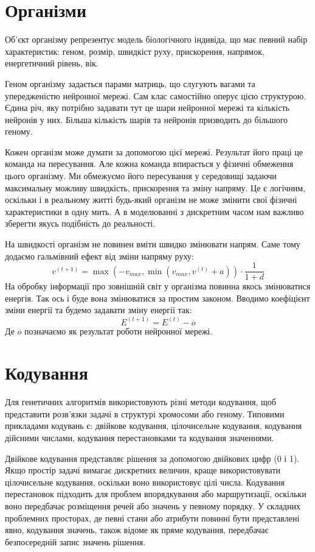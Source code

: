\section{Організми}

Об’єкт організму репрезентує модель біологічного індивіда, що має певний набір характеристик: геном, розмір, швидкіст руху, прискорення, напрямок, енергетичний рівень, вік.

Геном організму задається парами матриць, що слугують вагами та упередженістю нейронної мережі. Сам клас самостійно оперує цією структурою. Єдина річ, яку потрібно задавати тут це шари нейронної мережі та кількість нейронів у них. Більша кількість шарів та нейронів призводить до більшого геному.

Кожен організм може думати за допомогою цієї мережі. Результат його праці це команда на пересування. Але кожна команда впирається у фізичні обмеження цього організму. Ми обмежуємо його пересування у середовищі задаючи максимальну можливу швидкість, прискорення та зміну напряму. Це є логічним, оскільки і в реальному житті будь-який організм не може змінити свої фізичні характеристики в одну мить. А в моделюванні з дискретним часом нам важливо зберегти якусь подібність до реальності.

На швидкості організм не повинен вміти швидко змінювати напрям. Саме тому додаємо гальмівний ефект від зміни напряму руху:
\[
  v^{(t+1)} = \max(-v_{max}, \min(v_{max}, v^{(t)} + a)) \cdot \frac{1}{1 + d}
\]
На обробку інформації про зовнішній світ у організма повинна якось змінюватися енергія. Так ось і буде вона змінюватися за простим законом. Вводимо коефіцієнт зміни енергії  та будемо задавати зміну енергії так:
\[ E^{(t+1)} = E^{(t)} - \overline{o} \]
Де $\overline{o}$ позначаємо як результат роботи нейронної мережі.

\section{Кодування}

Для генетичних алгоритмів використовують різні методи кодування, щоб представити розв'язки задачі в структурі хромосоми або геному. Типовими прикладами кодувань є: двійкове кодування, цілочисельне кодування, кодування дійсними числами, кодування перестановками та кодування значеннями.

Двійкове кодування представляє рішення за допомогою двійкових цифр       (0 і 1). Якщо простір задачі вимагає дискретних величин, краще використовувати цілочисельне кодування, оскільки воно використовує цілі числа. Кодування перестановок підходить для проблем впорядкування або маршрутизації, оскільки воно передбачає розміщення речей або значень у певному порядку. У складних проблемних просторах, де певні стани або атрибути повинні бути представлені явно, кодування значень, також відоме як пряме кодування, передбачає безпосередній запис значень рішення.

